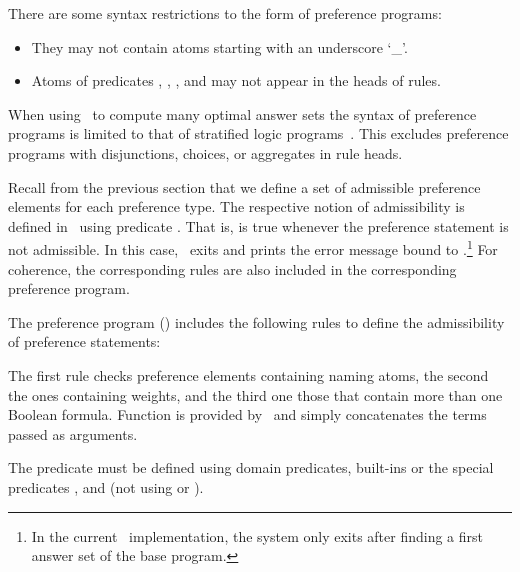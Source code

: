 \begin{note}
There are some syntax restrictions to the form of preference programs:
\begin{itemize}
\item They may not contain atoms starting with an underscore `\_'.
\item Atoms of predicates , , 
      ,  and 
      may not appear in the heads of rules.
\end{itemize}
\end{note}

\begin{note}
When using \asprin\ to compute many optimal answer sets the syntax of preference programs
is limited to that of stratified logic programs~\cite{apblwa87a}.
This excludes preference programs with disjunctions, choices, or aggregates in rule heads.
\end{note}

Recall from the previous section that we define a set of admissible preference elements for each preference type.
The respective notion of admissibility is defined in \asprin\ using predicate .
That is,  is true whenever the preference statement is not admissible.
In this case, \asprin\ exits and prints the error message bound to .\footnote{%
In the current \asprin\ implementation, 
the system only exits after finding a first answer set of the base program.}
For coherence, the corresponding rules are also included in the corresponding preference program.
\begin{example}
The preference program ()
includes the following rules to define the admissibility of  preference statements:
%

%
The first rule checks preference elements containing naming atoms, 
the second the ones containing weights, 
and the third one those that contain more than one Boolean formula.
Function  is provided by \asprin\ and simply concatenates the terms passed as arguments.
\end{example}

\begin{note}
The predicate  must be defined using domain predicates, built-ins or the special 
predicates ,  and  
(not using  or ).
\end{note}


